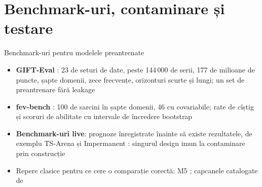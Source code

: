 \section{Benchmark-uri, contaminare și testare}

\begin{frame}{Benchmark-uri pentru modelele preantrenate}
\itemsize{\small}
\begin{itemize}
    \item \textbf{GIFT-Eval} : 23 de seturi de date, peste 144\,000 de serii, 177 de milioane de puncte, șapte domenii, zece frecvențe, orizonturi scurte și lungi; un set de preantrenare fără leakage
    \item \textbf{fev-bench} : 100 de sarcini în șapte domenii, 46 cu covariabile; rate de cîștig și scoruri de abilitate cu intervale de încredere bootstrap
    \item \textbf{Benchmark-uri live}: prognoze înregistrate înainte să existe rezultatele, de exemplu TS-Arena  și Impermanent : singurul design imun la contaminare prin construcție
    \item Repere clasice pentru ce cere o comparație corectă: M5 ; capcanele catalogate de 
\end{itemize}
\end{frame}

